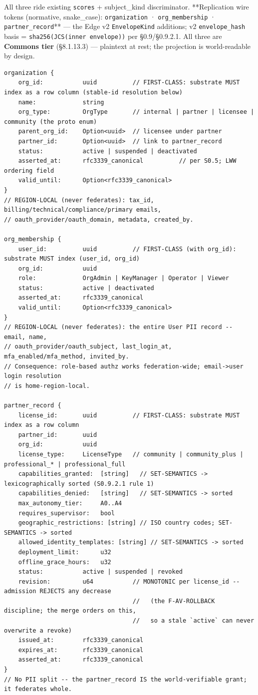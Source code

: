 \documentclass[11pt]{article}
\begin{document}
All three ride existing \texttt{scores} + subject\_kind discriminator. **Replication wire tokens (normative, snake\_case): \texttt{organization} · \texttt{org\_membership} · \texttt{partner\_record}** — the Edge v2 \texttt{EnvelopeKind} additions; v2 \texttt{envelope\_hash} basis = \texttt{sha256(JCS(inner envelope))} per §0.9/§0.9.2.1. All three are \textbf{Commons tier} (§8.1.13.3) — plaintext at rest; the projection is world-readable by design.


\begin{lstlisting}
organization {
    org_id:           uuid          // FIRST-CLASS: substrate MUST index as a row column (stable-id resolution below)
    name:             string
    org_type:         OrgType       // internal | partner | licensee | community (the proto enum)
    parent_org_id:    Option<uuid>  // licensee under partner
    partner_id:       Option<uuid>  // link to partner_record
    status:           active | suspended | deactivated
    asserted_at:      rfc3339_canonical          // per S0.5; LWW ordering field
    valid_until:      Option<rfc3339_canonical>
}
// REGION-LOCAL (never federates): tax_id, billing/technical/compliance/primary emails,
// oauth_provider/oauth_domain, metadata, created_by.

org_membership {
    user_id:          uuid          // FIRST-CLASS (with org_id): substrate MUST index (user_id, org_id)
    org_id:           uuid
    role:             OrgAdmin | KeyManager | Operator | Viewer
    status:           active | deactivated
    asserted_at:      rfc3339_canonical
    valid_until:      Option<rfc3339_canonical>
}
// REGION-LOCAL (never federates): the entire User PII record -- email, name,
// oauth_provider/oauth_subject, last_login_at, mfa_enabled/mfa_method, invited_by.
// Consequence: role-based authz works federation-wide; email->user login resolution
// is home-region-local.

partner_record {
    license_id:       uuid          // FIRST-CLASS: substrate MUST index as a row column
    partner_id:       uuid
    org_id:           uuid
    license_type:     LicenseType   // community | community_plus | professional_* | professional_full
    capabilities_granted:  [string]   // SET-SEMANTICS -> lexicographically sorted (S0.9.2.1 rule 1)
    capabilities_denied:   [string]   // SET-SEMANTICS -> sorted
    max_autonomy_tier:     A0..A4
    requires_supervisor:   bool
    geographic_restrictions: [string] // ISO country codes; SET-SEMANTICS -> sorted
    allowed_identity_templates: [string] // SET-SEMANTICS -> sorted
    deployment_limit:      u32
    offline_grace_hours:   u32
    status:           active | suspended | revoked
    revision:         u64           // MONOTONIC per license_id -- admission REJECTS any decrease
                                    //   (the F-AV-ROLLBACK discipline; the merge orders on this,
                                    //   so a stale `active` can never overwrite a revoke)
    issued_at:        rfc3339_canonical
    expires_at:       rfc3339_canonical
    asserted_at:      rfc3339_canonical
}
// No PII split -- the partner_record IS the world-verifiable grant; it federates whole.
\end{lstlisting}
\end{document}
